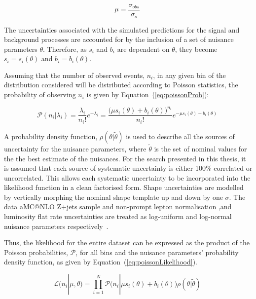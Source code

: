 \begin{equation}
\mu = \frac{\sigma_{obs}}{\sigma_{s}}  \;
\label{eq:signalModifier}
\end{equation}
 
The uncertainties associated with the simulated predictions for the signal and background processes are accounted for by the inclusion of a set of nuisance parameters $\theta$.
Therefore, as $s_{i}$ and $b_{i}$ are dependent on $\theta$, they become $s_{i} = s_{i} (\theta)$ and $b_{i} = b_{i} (\theta)$.

Assuming that the number of observed events, $n_{i}$, in any given bin of the distribution considered will be distributed according to Poisson statistics, the probability of observing $n_{i}$ is given by Equation~(\ref{eq:poissonProb}):

\begin{equation}
\mathcal{P} ( n_{i} | \lambda_{i} ) = \frac{\lambda_{i}}{n_{i}!} e^{- \lambda_{i}} = \frac{ \big( \mu s_{i}(\theta) + b_{i}(\theta) \big)^{n_{i}}}{n_{i} !} e^{- \mu s_{i}(\theta) - b_{i}(\theta)}  \;
\label{eq:poissonProb}
\end{equation}

A probability density function, $\rho ( \theta | \tilde{\theta} )$ is used to describe all the sources of uncertainty for the nuisance parameters, where $\tilde{\theta}$ is the set of nominal values for the the best estimate of the nuisances.
For the search presented in this thesis, it is assumed that each source of systematic uncertainty is either 100\% correlated or uncorrelated.
This allows each systematic uncertainty to be incorporated into the likelihood function in a clean factorised form.
Shape uncertainties are modelled by vertically morphing the nominal shape template up and down by one $\sigma$.
The data aMC@NLO Z+jets sample and non-prompt lepton normalisation ,and luminosity flat rate uncertainties are treated as log-uniform and log-normal nuisance parameters respectively~\cite{Baak:2014fta,AsymptoticFormulae}.

Thus, the likelihood for the entire dataset can be expressed as the product of the Poisson probabilities, $\mathcal{P}$, for all bins and the nuisance parameters' probability density function, as given by Equation~(\ref{eq:poissonLikelihood}).

\begin{equation}
\mathcal{L} ( n_{i} | \mu , \theta ) = 
\prod_{i=1}^{N} \mathcal{P} \big( n_{i} | \mu s_{i}(\theta) + b_{i}(\theta) \big) \rho ( \theta | \tilde{\theta} ) \;
\label{eq:poissonLikelihood}
\end{equation}

